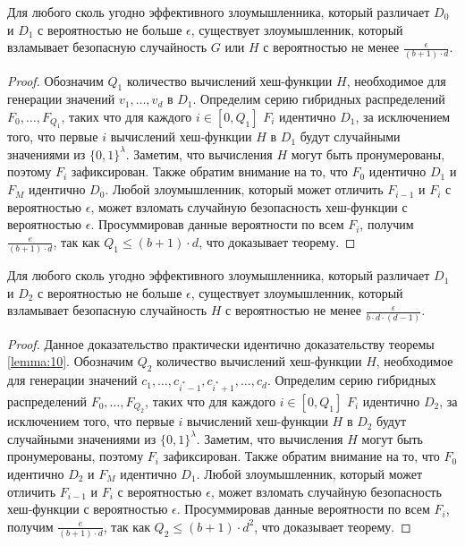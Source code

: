 \begin{theorem}
	\label{lemma:10}
	Для любого сколь угодно эффективного злоумышленника, который различает $D_0$ и $D_1$ с вероятностью не больше $\epsilon$, существует злоумышленник, который взламывает безопасную случайность $G$ или $H$ с вероятностью не менее $\frac{\epsilon}{(b + 1) \cdot d}$.
\end{theorem}

\begin{proof}
	Обозначим $Q_1$ количество вычислений хеш-функции $H$, необходимое для генерации значений $v_1, \dots, v_d$ в $D_1$.
	Определим серию гибридных распределений $F_0, \dots, F_{Q_1}$, таких что для каждого $i \in [0, Q_1]$ $F_i$ идентично $D_1$, за исключением того, что первые $i$ вычислений хеш-функции $H$ в $D_1$ будут случайными значениями из $\{0, 1\}^\lambda$.
	Заметим, что вычисления $H$ могут быть пронумерованы, поэтому $F_i$ зафиксирован.
	Также обратим внимание на то, что $F_0$ идентично $D_1$ и $F_M$ идентично $D_0$.
	Любой злоумышленник, который может отличить $F_{i - 1}$ и $F_{i}$ с вероятностью $\epsilon$, может взломать случайную безопасность хеш-функции с вероятностью $\epsilon$.
	Просуммировав данные вероятности по всем $F_i$, получим $\frac{e}{(b + 1) \cdot d}$, так как $Q_1 \leq (b + 1) \cdot d$, что доказывает теорему.
\end{proof}

\begin{theorem}
	\label{lemma:11}
	Для любого сколь угодно эффективного злоумышленника, который различает $D_1$ и $D_2$ с вероятностью не больше $\epsilon$, существует злоумышленник, который взламывает безопасную случайность $H$ с вероятностью не менее $\frac{\epsilon}{b \cdot d \cdot (d - 1)}$.
\end{theorem}

\begin{proof}
	Данное доказательство практически идентично доказательству теоремы \ref{lemma:10}.
	Обозначим $Q_2$ количество вычислений хеш-функции $H$, необходимое для генерации значений $c_1, \dots, c_{i^* - 1}, c_{i^* + 1}, \dots, c_d$.
	Определим серию гибридных распределений $F_0, \dots, F_{Q_2}$, таких что для каждого $i \in [0, Q_1]$ $F_i$ идентично $D_2$, за исключением того, что первые $i$ вычислений хеш-функции $H$ в $D_2$ будут случайными значениями из $\{0, 1\}^\lambda$.
	Заметим, что вычисления $H$ могут быть пронумерованы, поэтому $F_i$ зафиксирован.
	Также обратим внимание на то, что $F_0$ идентично $D_2$ и $F_M$ идентично $D_1$.
	Любой злоумышленник, который может отличить $F_{i - 1}$ и $F_{i}$ с вероятностью $\epsilon$, может взломать случайную безопасность хеш-функции с вероятностью $\epsilon$.
	Просуммировав данные вероятности по всем $F_i$, получим $\frac{e}{(b + 1) \cdot d}$, так как $Q_2 \leq (b + 1) \cdot d^2$, что доказывает теорему.
\end{proof}

